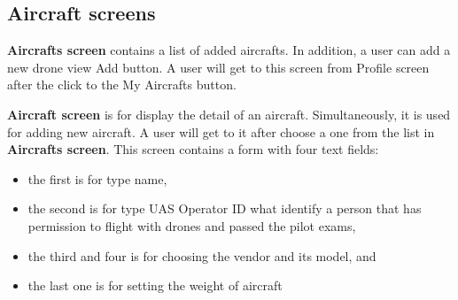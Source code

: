 \subsection{Aircraft screens}\label{subsec:aircraft-screens}
\textbf{Aircrafts screen} contains a list of added aircrafts.
In addition, a user can add a new drone view Add button.
A user will get to this screen from Profile screen after the click to the My Aircrafts button.

\textbf{Aircraft screen} is for display the detail of an aircraft.
Simultaneously, it is used for adding new aircraft.
A user will get to it after choose a one from the list in \textbf{Aircrafts screen}.
This screen contains a form with four text fields:
\begin{itemize}
    \item the first is for type name,
    \item the second is for type UAS Operator ID what identify a person that has permission to flight with drones and passed the pilot exams,
    \item the third and four is for choosing the vendor and its model, and
    \item the last one is for setting the weight of aircraft
\end{itemize}

